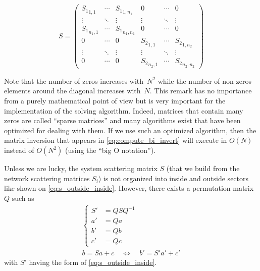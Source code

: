 \begin{equation}
    S =
    \begin{pmatrix}
        {S_1}_{1, 1} & \cdots & {S_1}_{1, n_1} &
        0 & \cdots & 0
        \\
        \vdots & \ddots &\vdots &
        \vdots & \ddots &\vdots 
        \\
        {S_1}_{n_1, 1} & \cdots & {S_1}_{n_1, n_1} &
        0 & \cdots & 0
        \\
        0 & \cdots & 0 &
        {S_2}_{1, 1} & \cdots & {S_2}_{1, n_2}
        \\
        \vdots & \ddots &\vdots &
        \vdots & \ddots &\vdots
        \\
        0 & \cdots & 0 &
        {S_2}_{n_2, 1} & \cdots & {S_2}_{n_2, n_2}
    \end{pmatrix}
    \label{eq:block_scattering}
\end{equation}

Note that the number of zeros increases with~$N^2$ while the number of non-zeros elements around the diagonal increases with~$N$.
This remark has no importance from a purely mathematical point of view but is very important for the implementation of the solving algorithm.
Indeed, matrices that contain many zeros are called ``sparse matrices'' and many algorithms exist that have been optimized for dealing with them.
If we use such an optimized algorithm, then the matrix inversion that appears in \cref{eq:compute_bi_invert} will execute in $O(N)$ instead of $O(N^2)$ (using the ``big O notation'').

Unless we are lucky, the system scattering matrix $S$ (that we build from the network scattering matrices $S_i$) is not organized into inside and outside sectors like shown on \cref{eq:s_outside_inside}.
However, there exists a permutation matrix~$Q$ such as
\begin{gather}
    \left\lbrace
    \begin{aligned}
        S' &= Q S Q^{-1} \\
        a' &= Q a \\
        b' &= Q b \\
        c' &= Q c
    \end{aligned}
    \right.
    \label{eq:permute_s}
    \\
    b = S a + c\quad \Longleftrightarrow \quad b' = S' a' +c'\label{eq:permute_s_equiv}
\end{gather}
with $S'$ having the form of \cref{eq:s_outside_inside}.


